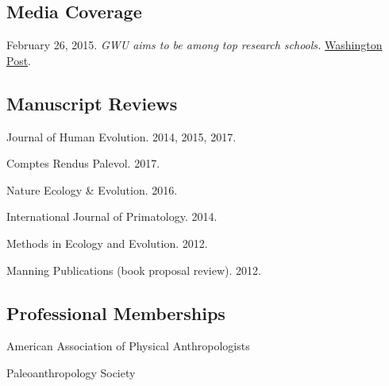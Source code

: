 \documentclass{article}
\begin{document}
\subsection*{Media Coverage}
\begin{description*}
\item[] February 26, 2015. \emph{GWU aims to be among top research schools.} \href{http://www.washingtonpost.com/local/education/gwu-aims-to-be-among-top-research-schools/2015/03/03/491da24e-c1f1-11e4-9ec2-b418f57a4a99_gallery.html}{Washington Post}.
\end{description*}

\subsection*{Manuscript Reviews}
\begin{description*}
\item[] Journal of Human Evolution. 2014, 2015, 2017.
\item[] Comptes Rendus Palevol. 2017.
\item[] Nature Ecology \& Evolution. 2016.
\item[] International Journal of Primatology. 2014.
\item[] Methods in Ecology and Evolution. 2012.
\item[] Manning Publications (book proposal review). 2012.
\end{description*}
\subsection*{Professional Memberships}
\begin{description*}
\item[] American Association of Physical Anthropologists
\item[] Paleoanthropology Society
\end{description*}
\end{document}
